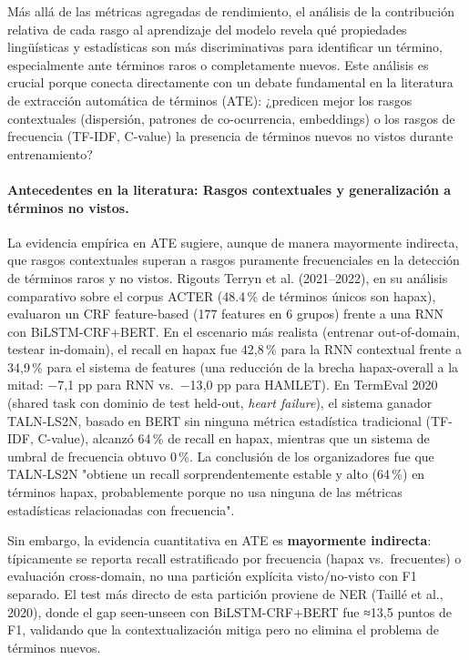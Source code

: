 Más allá de las métricas agregadas de rendimiento, el análisis de la contribución relativa de cada rasgo al aprendizaje del modelo revela qué propiedades lingüísticas y estadísticas son más discriminativas para identificar un término, especialmente ante términos raros o completamente nuevos. Este análisis es crucial porque conecta directamente con un debate fundamental en la literatura de extracción automática de términos (ATE): ¿predicen mejor los rasgos contextuales (dispersión, patrones de co-ocurrencia, embeddings) o los rasgos de frecuencia (TF-IDF, C-value) la presencia de términos nuevos no vistos durante entrenamiento?

\paragraph{Antecedentes en la literatura: Rasgos contextuales y generalización a términos no vistos.}
La evidencia empírica en ATE sugiere, aunque de manera mayormente indirecta, que rasgos contextuales superan a rasgos puramente frecuenciales en la detección de términos raros y no vistos. Rigouts Terryn et al. (2021--2022), en su análisis comparativo sobre el corpus ACTER (48.4\,\% de términos únicos son hapax), evaluaron un CRF feature-based (177 features en 6 grupos) frente a una RNN con BiLSTM-CRF+BERT. En el escenario más realista (entrenar out-of-domain, testear in-domain), el recall en hapax fue 42{,}8\,\% para la RNN contextual frente a 34{,}9\,\% para el sistema de features (una reducción de la brecha hapax-overall a la mitad: −7{,}1 pp para RNN vs.\ −13{,}0 pp para HAMLET). En TermEval 2020 (shared task con dominio de test held-out, \textit{heart failure}), el sistema ganador TALN-LS2N, basado en BERT sin ninguna métrica estadística tradicional (TF-IDF, C-value), alcanzó 64\,\% de recall en hapax, mientras que un sistema de umbral de frecuencia obtuvo 0\,\%. La conclusión de los organizadores fue que TALN-LS2N "obtiene un recall sorprendentemente estable y alto (64\,\%) en términos hapax, probablemente porque no usa ninguna de las métricas estadísticas relacionadas con frecuencia".

Sin embargo, la evidencia cuantitativa en ATE es \textbf{mayormente indirecta}: típicamente se reporta recall estratificado por frecuencia (hapax vs.\ frecuentes) o evaluación cross-domain, no una partición explícita visto/no-visto con F1 separado. El test más directo de esta partición proviene de NER (Taillé et al., 2020), donde el gap seen-unseen con BiLSTM-CRF+BERT fue ≈13{,}5 puntos de F1, validando que la contextualización mitiga pero no elimina el problema de términos nuevos.

